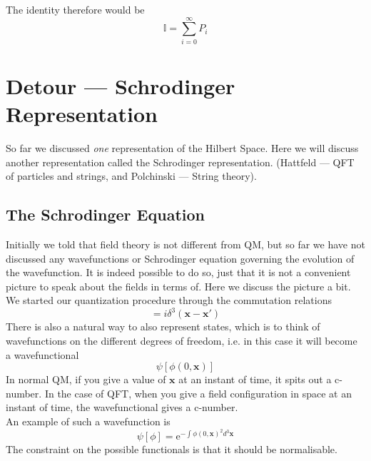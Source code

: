 \documentclass[11pt, notitlepage]{report}
\newcommand{\e}{\mathrm{e}}
\numberwithin{equation}{section}
\begin{document}
    The identity therefore would be 
    \begin{equation*}
        \mathbb{I} = \sum_{i=0}^\infty P_i
    \end{equation*}
    
    \newpage
    \section{Detour — Schrodinger Representation}
    So far we discussed \textit{one} representation of the Hilbert Space. Here we will discuss another representation called the Schrodinger representation. (Hattfeld — QFT of particles and strings, and Polchinski — String theory).

    \subsection{The Schrodinger Equation}

    Initially we told that field theory is not different from QM, but so far we have not discussed any wavefunctions or Schrodinger equation governing the evolution of the wavefunction. It is indeed possible to do so, just that it is not a convenient picture to speak about the fields in terms of. Here we discuss the picture a bit.\\

    We started our quantization procedure through the commutation relations
    \begin{equation}
        [\phi(0, \textbf{x}), \Pi(0, \textbf{x}')] = i\delta^3(\textbf{x} - \textbf{x}')
    \end{equation}
    There is also a natural way to also represent states, which is to think of wavefunctions on the different degrees of freedom, i.e. in this case it will become a wavefunctional 
    \begin{equation}
        \psi[\phi(0,\textbf{x})]
    \end{equation}
    In normal QM, if you give a value of \(\textbf{x}\) at an instant of time, it spits out a c-number. In the case of QFT, when you give a field configuration in space at an instant of time, the wavefunctional gives a c-number. \\

    An example of such a wavefunction is 
    \begin{equation}
        \psi[\phi] = \e^{-\int \phi(0, \textbf{x})^2d^3\textbf{x}}
    \end{equation}
    The constraint on the possible functionals is that it should be normalisable.\\
\end{document}
